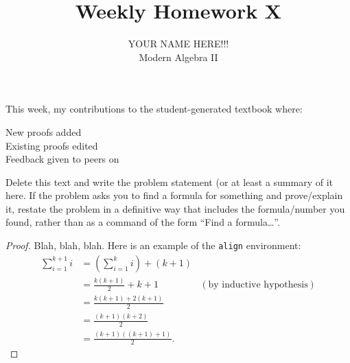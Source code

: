 \documentclass[12pt]{amsart}
\newenvironment{problem}[2][Problem]{\begin{trivlist}
\item[\hskip \labelsep {\bfseries #1}\hskip \labelsep {\bfseries #2.}]}{\end{trivlist}}
\begin{document}
 
 
\title{Weekly Homework X}%
\author{YOUR NAME HERE!!!\\ %
Modern Algebra II} %
 
\maketitle

This week, my contributions to the student-generated textbook where:
\begin{description}
\item[New proofs added] 
\item[Existing proofs edited] 
\item[Feedback given to peers on] 
\end{description}

\begin{problem}{x} %
Delete this text and write the problem statement (or at least a
summary of it here. If the problem asks you to find a formula for
something and prove/explain it, restate the problem in a definitive
way that includes the formula/number you found, rather than as a
command of the form ``Find a formula\dots''. 
\end{problem}
 
\begin{proof}
Blah, blah, blah.  Here is an example of the \texttt{align} environment:
\begin{align*}
\sum_{i=1}^{k+1}i & = \left(\sum_{i=1}^{k}i\right) +(k+1)\\ 
& = \frac{k(k+1)}{2}+k+1 & (\text{by inductive hypothesis})\\
& = \frac{k(k+1)+2(k+1)}{2}\\
& = \frac{(k+1)(k+2)}{2}\\
& = \frac{(k+1)((k+1)+1)}{2}.
\end{align*}
\end{proof}
 
\end{document}
